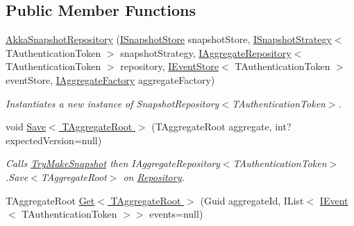 \subsection*{Public Member Functions}
\begin{DoxyCompactItemize}
\item 
\hyperlink{classCqrs_1_1Akka_1_1Snapshots_1_1AkkaSnapshotRepository_a59f8c7dabed645143699a8849627c213_a59f8c7dabed645143699a8849627c213}{Akka\+Snapshot\+Repository} (\hyperlink{interfaceCqrs_1_1Snapshots_1_1ISnapshotStore}{I\+Snapshot\+Store} snapshot\+Store, \hyperlink{interfaceCqrs_1_1Snapshots_1_1ISnapshotStrategy}{I\+Snapshot\+Strategy}$<$ T\+Authentication\+Token $>$ snapshot\+Strategy, \hyperlink{interfaceCqrs_1_1Domain_1_1IAggregateRepository}{I\+Aggregate\+Repository}$<$ T\+Authentication\+Token $>$ repository, \hyperlink{interfaceCqrs_1_1Events_1_1IEventStore}{I\+Event\+Store}$<$ T\+Authentication\+Token $>$ event\+Store, \hyperlink{interfaceCqrs_1_1Domain_1_1Factories_1_1IAggregateFactory}{I\+Aggregate\+Factory} aggregate\+Factory)
\begin{DoxyCompactList}\small\item\em Instantiates a new instance of Snapshot\+Repository$<$\+T\+Authentication\+Token$>$. \end{DoxyCompactList}\item 
void \hyperlink{classCqrs_1_1Akka_1_1Snapshots_1_1AkkaSnapshotRepository_adf399a4ea283ae725bf8f1229d6da30a_adf399a4ea283ae725bf8f1229d6da30a}{Save$<$ T\+Aggregate\+Root $>$} (T\+Aggregate\+Root aggregate, int? expected\+Version=null)
\begin{DoxyCompactList}\small\item\em Calls \hyperlink{classCqrs_1_1Akka_1_1Snapshots_1_1AkkaSnapshotRepository_ae9df38e7f69f1cae3c080fcf8a998a18_ae9df38e7f69f1cae3c080fcf8a998a18}{Try\+Make\+Snapshot} then I\+Aggregate\+Repository$<$\+T\+Authentication\+Token$>$.\+Save$<$\+T\+Aggregate\+Root$>$ on \hyperlink{classCqrs_1_1Akka_1_1Snapshots_1_1AkkaSnapshotRepository_a4961f1b8481f1205c143172185bae3bb_a4961f1b8481f1205c143172185bae3bb}{Repository}. \end{DoxyCompactList}\item 
T\+Aggregate\+Root \hyperlink{classCqrs_1_1Akka_1_1Snapshots_1_1AkkaSnapshotRepository_a953067de4f1ed8c4528e92bf896fbf79_a953067de4f1ed8c4528e92bf896fbf79}{Get$<$ T\+Aggregate\+Root $>$} (Guid aggregate\+Id, I\+List$<$ \hyperlink{interfaceCqrs_1_1Events_1_1IEvent}{I\+Event}$<$ T\+Authentication\+Token $>$$>$ events=null)
$$
\end{DoxyCompactItemize}
